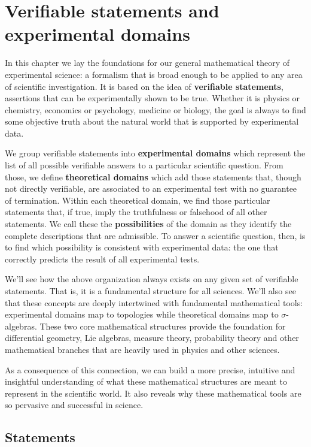 \documentclass[11pt,letterpaper,fleqn]{memoir} %
\begin{document}
\chapter{Verifiable statements and experimental domains}

In this chapter we lay the foundations for our general mathematical theory of experimental science: a formalism that is broad enough to be applied to any area of scientific investigation. It is based on the idea of \textbf{verifiable statements}, assertions that can be experimentally shown to be true. Whether it is physics or chemistry, economics or psychology, medicine or biology, the goal is always to find some objective truth about the natural world that is supported by experimental data.

We group verifiable statements into \textbf{experimental domains} which represent the list of all possible verifiable answers to a particular scientific question. From those, we define \textbf{theoretical domains} which add those statements that, though not directly verifiable, are associated to an experimental test with no guarantee of termination. Within each theoretical domain, we find those particular statements that, if true, imply the truthfulness or falsehood of all other statements. We call these the \textbf{possibilities} of the domain as they identify the complete descriptions that are admissible. To answer a scientific question, then, is to find which possibility is consistent with experimental data: the one that correctly predicts the result of all experimental tests.

We'll see how the above organization always exists on any given set of verifiable statements. That is, it is a fundamental structure for all sciences. We'll also see that these concepts are deeply intertwined with fundamental mathematical tools: experimental domains map to topologies while theoretical domains map to $\sigma$-algebras. These two core mathematical structures provide the foundation for differential geometry, Lie algebras, measure theory, probability theory and other mathematical branches that are heavily used in physics and other sciences.

As a consequence of this connection, we can build a more precise, intuitive and insightful understanding of what these mathematical structures are meant to represent in the scientific world. It also reveals why these mathematical tools are so pervasive and successful in science.

\section{Statements}
\end{document}
